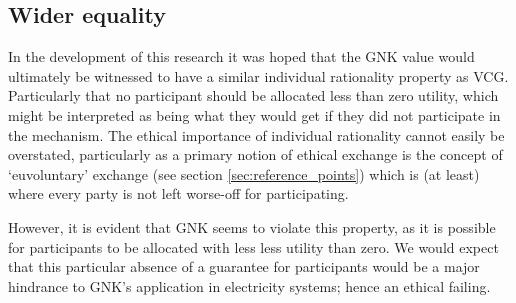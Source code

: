 


\subsection{Wider equality}\label{sec:wider_equality_gnk}

In the development of this research it was hoped that the GNK value would ultimately be witnessed to have a similar individual rationality property as VCG.
Particularly that no participant should be allocated less than zero utility, which might be interpreted as being what they would get if they did not participate in the mechanism.
The ethical importance of individual rationality cannot easily be overstated, particularly as a primary notion of ethical exchange is the concept of `euvoluntary' exchange (see section \ref{sec:reference_points}) which is (at least) where every party is not left worse-off for participating.

However, it is evident that GNK seems to violate this property, as it is possible for participants to be allocated with less less utility than zero.
We would expect that this particular absence of a guarantee for participants would be a major hindrance to GNK's application in electricity systems; hence an ethical failing.

